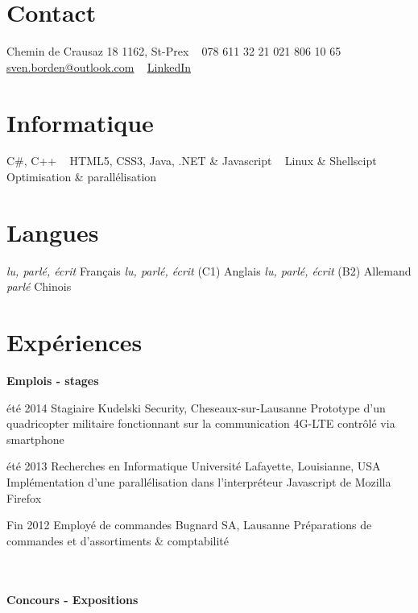 \documentclass[]{friggeri-cv}
\begin{document}
	
	
	\begin{aside} %
		\section{Contact}
		{\color{light-gray}{\FA \faHome}} \small{Chemin de Crausaz 18
		1162, St-Prex}
		~
		{\color{light-gray}{\FA \faMobile}} \small{078 611 32 21}
		{\color{light-gray}{\FA \faPhone}} \small{021 806 10 65}
		~
		{\color{light-gray}{\FA \faEnvelope}}\href{mailto:sven.borden@outlook.com}{\small{sven.borden@outlook.com}}
		~
		{\color{linkedin}{\FA \faLinkedin}} \href{https://www.linkedin.com/in/sven-borden-bba744a0}{LinkedIn}	
		~
		\section{Informatique}
		\small{{\color{red} \FA \faHeart} C\#, C++
			~
			{\color{html5}\FA {}} HTML5, CSS3,
			{\color{php}\FA \faCode} Java, .NET \& Javascript
			~
			{\color{gray}\FA \faLinux} Linux \& Shellscipt
			{\color{db}\FA \faTh} Optimisation \& parallélisation}
		~
		\section{Langues}
		\small{\emph{lu, parlé, écrit} Français
		\emph{lu, parlé, écrit} (C1) Anglais
		\emph{lu, parlé, écrit} (B2) Allemand
		\emph{parlé} Chinois}
	\end{aside}
	
	\section{Expériences}
	
	\textbf{Emplois - stages}\\ 
	
	\begin{entrylist}
		
		\entry
		{été 2014}
		{Stagiaire}
		{Kudelski Security, Cheseaux-sur-Lausanne}
		{Prototype d'un quadricopter militaire fonctionnant sur la communication 4G-LTE contrôlé via smartphone}
		
		\entry
		{été 2013}
		{Recherches en Informatique}
		{Université Lafayette, Louisianne, USA}
		{Implémentation d'une parallélisation dans l'interpréteur Javascript de Mozilla Firefox}
		
		\entry
		{Fin 2012}
		{Employé de commandes}
		{Bugnard SA, Lausanne}
		{Préparations de commandes et d'assortiments \& comptabilité}
		
	\end{entrylist}
	\\ \\
	\textbf{Concours - Expositions} \\ 
	
\end{document}
